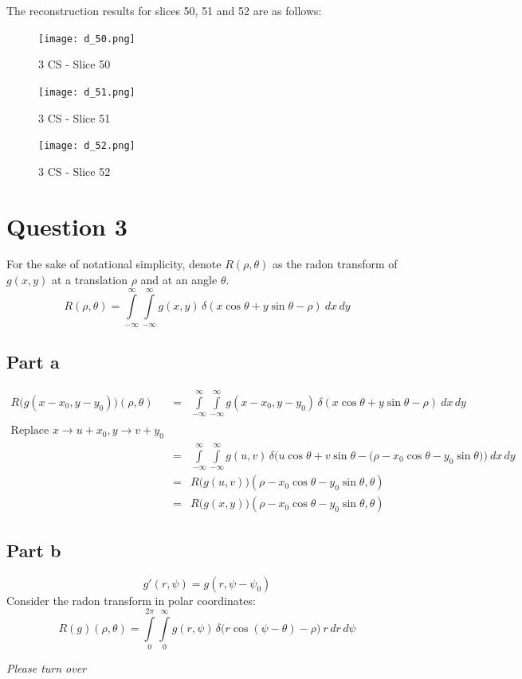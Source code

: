 \documentclass[12pt]{article}
\begin{document}
The reconstruction results for slices 50, 51 and 52 are as follows:
\begin{figure}[ht]
	\centering
	\begin{minipage}[bt]{0.3\linewidth}
		\centering
		\texttt{[image: d\_50.png]}
		\caption{3 CS - Slice 50}
	\end{minipage}
	\begin{minipage}[bt]{0.3\linewidth}
		\centering
		\texttt{[image: d\_51.png]}
		\caption{3 CS - Slice 51}
	\end{minipage}
	\begin{minipage}[bt]{0.3\linewidth}
		\centering
		\texttt{[image: d\_52.png]}
		\caption{3 CS - Slice 52}
	\end{minipage}
\end{figure}


\section*{Question 3}
For the sake of notational simplicity, denote $R(\rho, \theta)$ as the radon transform of $g(x, y)$ at a translation $\rho$ and at an angle $\theta$.
$$R(\rho, \theta) = \int\limits_{-\infty}^\infty \int \limits_{-\infty}^\infty g(x, y) \, \delta(x \cos\theta  + y \sin \theta - \rho)\: dx\,dy$$
\subsection*{Part a}
\begin{eqnarray*}
	R\big(g(x-x_0, y-y_0)\big)(\rho, \theta) &=& \int\limits_{-\infty}^\infty \int \limits_{-\infty}^\infty g(x-x_0, y-y_0)\,\delta(x \cos\theta  + y \sin \theta - \rho)\: dx\,dy\\\\
	\text{Replace } x \rightarrow u+x_0, y \rightarrow v+y_0&&\\
	&=& \int\limits_{-\infty}^\infty \int \limits_{-\infty}^\infty g(u, v)\, \delta\bigg(u\cos \theta + v \sin\theta - \big(\rho - x_0\cos\theta - y_0\sin\theta\big)\bigg)\: dx\,dy\\
	&=& R\big(g(u, v)\big)(\rho - x_0\cos\theta - y_0\sin\theta, \theta)\\
	&=& R\big(g(x, y)\big)(\rho - x_0\cos\theta - y_0\sin\theta, \theta)
\end{eqnarray*}

\subsection*{Part b}
$$g'(r, \psi) = g(r, \psi - \psi_0)$$
Consider the radon transform in polar coordinates:
$$R(g)(\rho, \theta) = \int \limits_{0}^{2\pi} \int \limits_{0}^\infty g(r, \psi)\, \delta\bigg(r\cos(\psi-\theta) - \rho\bigg)\: r\,dr\,d\psi$$
\vspace{2cm}
\begin{center}
	\textit{Please turn over}
\end{center}
\end{document}
